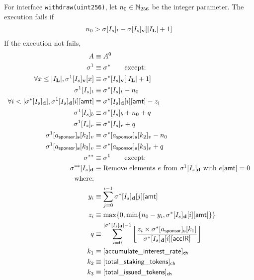 For interface {\tt withdraw(uint256)}, let $n_0 \in \mathbb{N}_{256}$ be the integer parameter. The execution fails if 
	\begin{align}
		n_0>\mathbf{\sigma}[I_s]_t - \mathbf{\sigma}[I_s]_{\bf v}[|I_\mathbf{L}|+1]
	\end{align}
	If the execution not fails, 
	\begin{align}
		A & \eqdef A^0 \\
		\st^1 &\eqdef \st^* \qquad \mbox{except:}\\
		\forall x\le |I_\mathbf{L}|, \st^1[I_s]_{\bf v}[x] &\eqdef \st^*[I_s]_{\bf v}[|I_\mathbf{L}|+1]\\ 
		\st^1[I_s]_t &\eqdef \st^*[I_s]_t - n_0\\ 
		\forall i < |\st^*[I_s]_{\bf d}|, \st^1[I_s]_{\bf d}[i][{\sf amt}] &\eqdef \st^*[I_s]_{\bf d}[i][{\sf amt}] - z_i \\
		\st^1[I_s]_b &\eqdef \st^*[I_s]_b + n_0 + q\\
		\st^1[I_s]_r &\eqdef \st^*[I_s]_r + q\\
		\st^1[a_{\sf sponsor}]_{\bf s}[k_2]_v & \eqdef\st^*[a_{\sf sponsor}]_{\bf s}[k_2]_v - n_0 \\
		\st^1[a_{\sf sponsor}]_{\bf s}[k_3]_v & \eqdef\st^*[a_{\sf sponsor}]_{\bf s}[k_3]_v + q \\
		\st^{**} &\eqdef \st^1 \qquad \mbox{except:}\\
		\st^{**}[I_s]_{\bf d} &\eqdef \mbox{Remove elements $e$ from $\st^1[I_s]_{\bf d}$ with $e[{\sf amt}]=0$} \\
		\mbox{where:}& \\
		y_i & \eqdef \sum_{j=0}^{i-1} \st^*[I_s]_{\bf d}[j][{\sf amt}] \\
		z_i & \eqdef \max\{0,\min\{n_0-y_i,\st^*[I_s]_{\bf d}[i][{\sf amt}]\}\} \\
		q & \eqdef \sum_{i=0}^{|\st^*[I_s]_{\bf d}|-1} \left\lfloor \frac{z_i \times \st^*[a_{\sf sponsor}]_{\bf s}[k_1]}{\st^*[I_s]_{\bf d}[i][{\sf accIR}]}\right\rfloor \\
		k_1 & \eqdef [{\sf accumulate\char`_interest\char`_rate}]_{\sf ch} \\
		k_2 & \eqdef [{\sf total\char`_staking\char`_tokens}]_{\sf ch} \\ 
		k_3 & \eqdef [{\sf total\char`_issued\char`_tokens}]_{\sf ch}
	\end{align}



